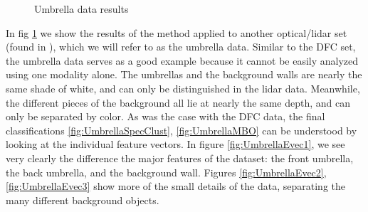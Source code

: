 \documentclass[journal]{IEEEtran}
\begin{document}
\begin{figure}[!t]
{    \label{fig:UmbrellaEvec3}} \hfil {} \hfil {} \hfil {}
  \caption{Umbrella data results}
  \label{fig:Umbrella}
\end{figure}

In fig \ref{fig:Umbrella} we show the results of the method applied to another
optical/lidar set (found in \cite{Scharstein14}), which we will refer to as the
umbrella data. Similar to the DFC set, the umbrella data serves as a good
example because it cannot be easily analyzed using one modality alone. The
umbrellas and the background walls are nearly the same shade of white, and can
only be distinguished in the lidar data. Meanwhile, the different pieces of the
background all lie at nearly the same depth, and can only be separated by
color. As was the case with the DFC data, the final classifications
\ref{fig:UmbrellaSpecClust}, \ref{fig:UmbrellaMBO} can be understood by looking
at the individual feature vectors. In figure \ref{fig:UmbrellaEvec1}, we see
very clearly the difference the major features of the dataset: the front
umbrella, the back umbrella, and the background wall. Figures
\ref{fig:UmbrellaEvec2}, \ref{fig:UmbrellaEvec3} show more of the small details
of the data, separating the many different background objects.
\end{document}
